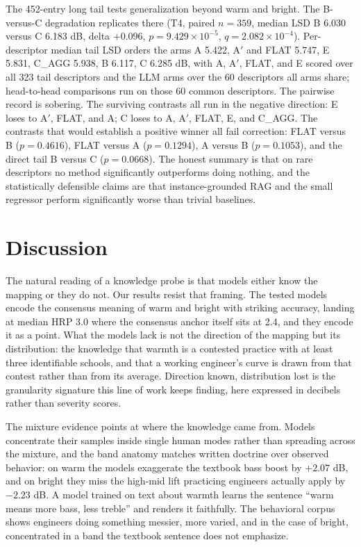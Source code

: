 \documentclass[11pt]{article}
\begin{document}
The 452-entry long tail tests generalization beyond warm and bright. The B-versus-C degradation replicates there (T4, paired $n=359$, median LSD B 6.030 versus C 6.183 dB, delta $+0.096$, $p=9.429\times10^{-5}$, $q=2.082\times10^{-4}$). Per-descriptor median tail LSD orders the arms A 5.422, A$'$ and FLAT 5.747, E 5.831, C\_AGG 5.938, B 6.117, C 6.285 dB, with A, A$'$, FLAT, and E scored over all 323 tail descriptors and the LLM arms over the 60 descriptors all arms share; head-to-head comparisons run on those 60 common descriptors. The pairwise record is sobering. The surviving contrasts all run in the negative direction: E loses to A$'$, FLAT, and A; C loses to A, A$'$, FLAT, E, and C\_AGG. The contrasts that would establish a positive winner all fail correction: FLAT versus B ($p=0.4616$), FLAT versus A ($p=0.1294$), A versus B ($p=0.1053$), and the direct tail B versus C ($p=0.0668$). The honest summary is that on rare descriptors no method significantly outperforms doing nothing, and the statistically defensible claims are that instance-grounded RAG and the small regressor perform significantly worse than trivial baselines.

\section{Discussion}

The natural reading of a knowledge probe is that models either know the mapping or they do not. Our results resist that framing. The tested models encode the consensus meaning of warm and bright with striking accuracy, landing at median HRP 3.0 where the consensus anchor itself sits at 2.4, and they encode it as a point. What the models lack is not the direction of the mapping but its distribution: the knowledge that warmth is a contested practice with at least three identifiable schools, and that a working engineer's curve is drawn from that contest rather than from its average. Direction known, distribution lost is the granularity signature this line of work keeps finding, here expressed in decibels rather than severity scores.

The mixture evidence points at where the knowledge came from. Models concentrate their samples inside single human modes rather than spreading across the mixture, and the band anatomy matches written doctrine over observed behavior: on warm the models exaggerate the textbook bass boost by $+2.07$ dB, and on bright they miss the high-mid lift practicing engineers actually apply by $-2.23$ dB. A model trained on text about warmth learns the sentence ``warm means more bass, less treble'' and renders it faithfully. The behavioral corpus shows engineers doing something messier, more varied, and in the case of bright, concentrated in a band the textbook sentence does not emphasize.
\end{document}
